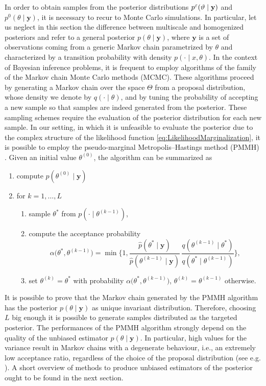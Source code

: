 \documentclass[10pt]{article}
\begin{document}
In order to obtain samples from the posterior distributions $p^\varepsilon(\vartheta \mid \mathbf y)$ and $p^0(\theta \mid \mathbf y)$, it is necessary to recur to Monte Carlo simulations. In particular, let us neglect in this section the difference between multiscale and homogenized posteriors and refer to a general posterior $p(\theta \mid \mathbf y)$, where $\mathbf y$ is a set of observations coming from a generic Markov chain parametrized by $\theta$ and characterized by a transition probability with density $p(\cdot \mid x, \theta)$. In the context of Bayesian inference problems, it is frequent to employ algorithms of the family of the Markov chain Monte Carlo methods (MCMC). These algorithms proceed by generating a Markov chain over the space $\Theta$ from a proposal distribution, whose density we denote by $q(\cdot \mid \theta)$, and by tuning the probability of accepting a new sample so that samples are indeed generated from the posterior. These sampling schemes require the evaluation of the posterior distribution for each new sample. In our setting, in which it is unfeasible to evaluate the posterior due to the complex structure of the likelihood function \eqref{eq:LikelihoodMarginalization}, it is possible to employ the pseudo-marginal Metropolis--Hastings method (PMMH) \cite{AnR09}. Given an initial value $\theta^{(0)}$, the algorithm can be summarized as
\begin{enumerate}[label=\textit{\alph*})]
	\item compute $p(\theta^{(0)} \mid \mathbf y)$ 
	\item\label{it:extForMH} for $k = 1, \ldots, L$
	\begin{enumerate}[label=\ref{it:extForMH}.\arabic*)]
		\item sample $\theta^*$ from $p(\cdot \mid \theta^{(k-1)})$,
		\item compute the acceptance probability
		\begin{equation}
			\alpha\big(\theta^*, \theta^{(k-1)}\big) = \min\Big\{1, \frac{\hat p(\theta^* \mid \mathbf y)}{\hat p(\theta^{(k-1)} \mid \mathbf y)} \, \frac{q(\theta^{(k-1)} \mid \theta^*)}{q(\theta^* \mid \theta^{(k-1)})}\Big\},
		\end{equation}
		\item set $\theta^{(k)} = \theta^*$ with probability $\alpha\big(\theta^*, \theta^{(k-1)}\big)$, $\theta^{(k)} = \theta^{(k-1)}$ otherwise.
	\end{enumerate}
\end{enumerate}
It is possible to prove \cite{AnR09} that the Markov chain generated by the PMMH algorithm has the posterior $p(\theta \mid \mathbf y)$ as unique invariant distribution. Therefore, choosing $L$ big enough it is possible to generate samples distributed as the targeted posterior. The performances of the PMMH algorithm strongly depend on the quality of the unbiased estimator $\hat p(\theta \mid \mathbf y)$. In particular, high values for the variance result in Markov chains with a degenerate behaviour, i.e., an extremely low acceptance ratio, regardless of the choice of the proposal distribution (see e.g. \cite{DPD15}). A short overview of methods to produce unbiased estimators of the posterior ought to be found in the next section.
\end{document}
